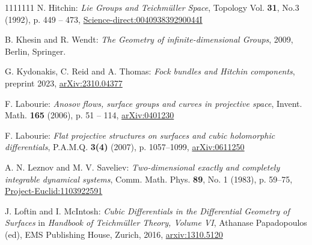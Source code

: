 \documentclass[11pt]{amsart}
\numberwithin{thm}{section} %
\numberwithin{equation}{section} %
\numberwithin{figure}{section} %
\begin{document}
\begin{thebibliography}{1111111}
N. Hitchin: \textit{Lie Groups and Teichm\"uller Space}, Topology Vol. \textbf{31}, No.3 (1992), p. 449 -- 473, \href{https://www.sciencedirect.com/science/article/pii/004093839290044I}{Science-direct:004093839290044I}



B. Khesin and R. Wendt: \textit{The Geometry of infinite-dimensional Groups}, 2009, Berlin, Springer.

G. Kydonakis, C. Reid and A. Thomas: \textit{Fock bundles and Hitchin components}, preprint 2023, \href{https://arxiv.org/pdf/2310.04377.pdf}{arXiv:2310.04377}


F. Labourie: \textit{Anosov flows, surface groups and curves in projective space}, Invent. Math. \textbf{165} (2006), p. 51 -- 114, \href{https://arxiv.org/pdf/math/0401230.pdf}{arXiv:0401230}


F. Labourie: \textit{Flat projective structures on surfaces and cubic holomorphic differentials}, P.A.M.Q. \textbf{3(4)} (2007), p. 1057--1099, \href{https://arxiv.org/pdf/math/0611250.pdf}{arXiv:0611250}

A. N. Leznov and M. V. Saveliev: \textit{Two-dimensional exactly and completely integrable dynamical systems}, Comm. Math. Phys. \textbf{89}, No. 1 (1983), p. 59--75, \href{https://projecteuclid.org/journals/communications-in-mathematical-physics/volume-89/issue-1/Two-dimensional-exactly-and-completely-integrable-dynamical-systems-Monopoles-instantons/cmp/1103922591.full}{Project-Euclid:1103922591}

J. Loftin and I. McIntosh: \textit{Cubic Differentials in the Differential Geometry of Surfaces} in \textit{Handbook of Teichmüller Theory, Volume VI}, Athanase Papadopoulos (ed), EMS Publishing House, Zurich, 2016, \href{https://arxiv.org/abs/1310.5120}{arxiv:1310.5120}



\end{thebibliography}
\end{document}
